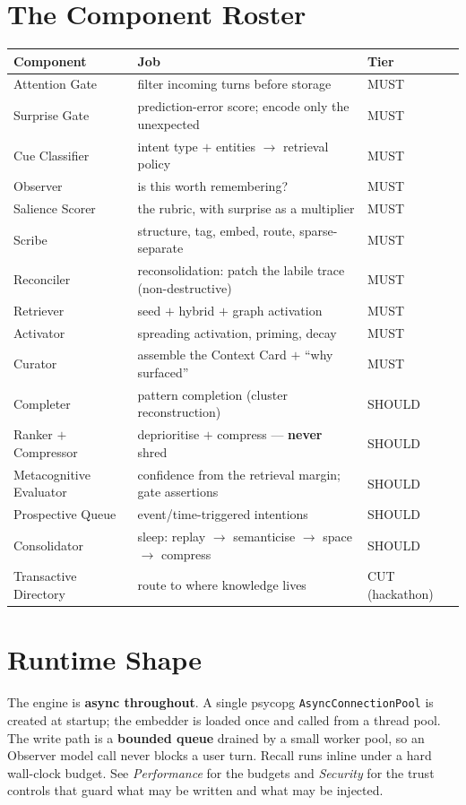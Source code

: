 \section{The Component Roster}
\begin{longtable}{@{}p{}p{}p{}@{}}
\toprule
Component & Job & Tier \\
\midrule
Attention Gate & filter incoming turns before storage & MUST \\
Surprise Gate & prediction-error score; encode only the unexpected & MUST \\
Cue Classifier & intent type $+$ entities $\rightarrow$ retrieval policy & MUST \\
Observer & is this worth remembering? & MUST \\
Salience Scorer & the rubric, with surprise as a multiplier & MUST \\
Scribe & structure, tag, embed, route, sparse-separate & MUST \\
Reconciler & reconsolidation: patch the labile trace (non-destructive) & MUST \\
Retriever & seed $+$ hybrid $+$ graph activation & MUST \\
Activator & spreading activation, priming, decay & MUST \\
Curator & assemble the Context Card $+$ ``why surfaced'' & MUST \\
Completer & pattern completion (cluster reconstruction) & SHOULD \\
Ranker $+$ Compressor & deprioritise $+$ compress --- \textbf{never} shred & SHOULD \\
Metacognitive Evaluator & confidence from the retrieval margin; gate assertions & SHOULD \\
Prospective Queue & event/time-triggered intentions & SHOULD \\
Consolidator & sleep: replay $\rightarrow$ semanticise $\rightarrow$ space $\rightarrow$ compress & SHOULD \\
Transactive Directory & route to where knowledge lives & CUT (hackathon) \\
\bottomrule
\end{longtable}

\section{Runtime Shape}
The engine is \textbf{async throughout}. A single psycopg \texttt{AsyncConnectionPool} is created at startup; the
embedder is loaded once and called from a thread pool. The write path is a \textbf{bounded queue}
drained by a small worker pool, so an Observer model call never blocks a user turn. Recall runs inline
under a hard wall-clock budget. See \emph{Performance} for the budgets and \emph{Security} for the
trust controls that guard what may be written and what may be injected.

